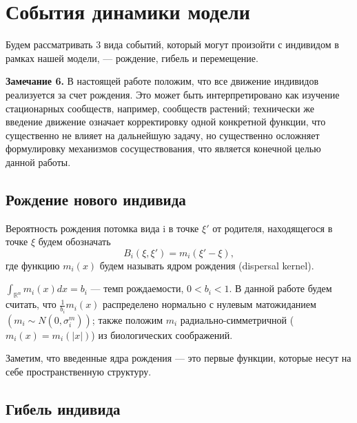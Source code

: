 \section{События динамики модели}

Будем рассматривать 3 вида событий, который могут произойти с индивидом в рамках нашей модели, --- рождение, гибель и перемещение.

\textbf{Замечание 6.} В настоящей работе положим, что все движение индивидов реализуется за счет рождения. Это может быть интерпретировано как изучение стационарных сообществ, например, сообществ растений; технически же введение движение означает корректировку одной конкретной функции, что существенно не влияет на дальнейшую задачу, но существенно осложняет формулировку механизмов сосуществования, что является конечной целью данной работы.

\subsection{Рождение нового индивида}

Вероятность рождения потомка вида i в точке $ \xi' $ от родителя, находящегося в точке $ \xi $ будем обозначать
\begin{equation*}
B_{i}(\xi,\xi')=m_{i}(\xi'-\xi),
\end{equation*}
где функцию $ m_{i}(x) $ будем называть ядром рождения (dispersal kernel).

$ \int_{\mathbb{R}^{n}}m_{i}(x)dx=b_{i} $ --- темп рождаемости, $ 0<b_{i}<1 $. В данной работе будем считать, что $ \frac{1}{b_{i}}m_{i}(x) $ распределено нормально с нулевым матожиданием $ \left(m_{i}\sim N(0,\sigma_{i}^{m})\right) $; также положим $ m_{i} $ радиально-симметричной ($ m_{i}(x)=m_{i}(|x|) $) из биологических соображений.

Заметим, что введенные ядра рождения --- это первые функции, которые несут на себе пространственную структуру.

\subsection{Гибель индивида}

